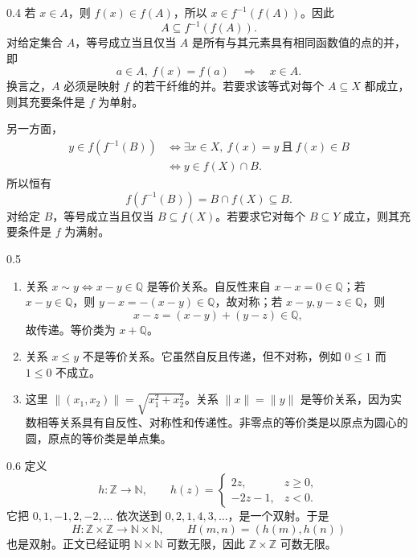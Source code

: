 \begin{solution}{0.4}
若 \(x\in A\)，则 \(f(x)\in f(A)\)，所以 \(x\in f^{-1}(f(A))\)。因此
\[
  A\subseteq f^{-1}(f(A)).
\]
对给定集合 \(A\)，等号成立当且仅当 \(A\) 是所有与其元素具有相同函数值的点的并，即
\[
  a\in A,\ f(x)=f(a)\quad\Longrightarrow\quad x\in A.
\]
换言之，\(A\) 必须是映射 \(f\) 的若干纤维的并。若要求该等式对每个 \(A\subseteq X\) 都成立，则其充要条件是 \(f\) 为单射。

另一方面，
\[
\begin{aligned}
y\in f(f^{-1}(B))
&\Leftrightarrow \exists x\in X,\ f(x)=y\ \text{且}\ f(x)\in B\\
&\Leftrightarrow y\in f(X)\cap B.
\end{aligned}
\]
所以恒有
\[
  f(f^{-1}(B))=B\cap f(X)\subseteq B.
\]
对给定 \(B\)，等号成立当且仅当 \(B\subseteq f(X)\)。若要求它对每个 \(B\subseteq Y\) 成立，则其充要条件是 \(f\) 为满射。
\end{solution}

\begin{solution}{0.5}
\begin{enumerate}[label=(\arabic*)]
  \item 关系 \(x\sim y\Longleftrightarrow x-y\in\mathbb Q\) 是等价关系。自反性来自 \(x-x=0\in\mathbb Q\)；若 \(x-y\in\mathbb Q\)，则 \(y-x=-(x-y)\in\mathbb Q\)，故对称；若 \(x-y,y-z\in\mathbb Q\)，则
  \[
    x-z=(x-y)+(y-z)\in\mathbb Q,
  \]
  故传递。等价类为 \(x+\mathbb Q\)。

  \item 关系 \(x\le y\) 不是等价关系。它虽然自反且传递，但不对称，例如 \(0\le1\) 而 \(1\le0\) 不成立。

  \item 这里 \(\|(x_1,x_2)\|=\sqrt{x_1^2+x_2^2}\)。关系 \(\|x\|=\|y\|\) 是等价关系，因为实数相等关系具有自反性、对称性和传递性。非零点的等价类是以原点为圆心的圆，原点的等价类是单点集。
\end{enumerate}
\end{solution}

\begin{solution}{0.6}
定义
\[
  h:\mathbb Z\longrightarrow\mathbb N,\qquad
  h(z)=
  \begin{cases}
    2z,&z\ge0,\\
    -2z-1,&z<0.
  \end{cases}
\]
它把 \(0,1,-1,2,-2,\ldots\) 依次送到 \(0,2,1,4,3,\ldots\)，是一个双射。于是
\[
  H:\mathbb Z\times\mathbb Z\longrightarrow\mathbb N\times\mathbb N,
  \qquad H(m,n)=(h(m),h(n))
\]
也是双射。正文已经证明 \(\mathbb N\times\mathbb N\) 可数无限，因此 \(\mathbb Z\times\mathbb Z\) 可数无限。
\end{solution}

